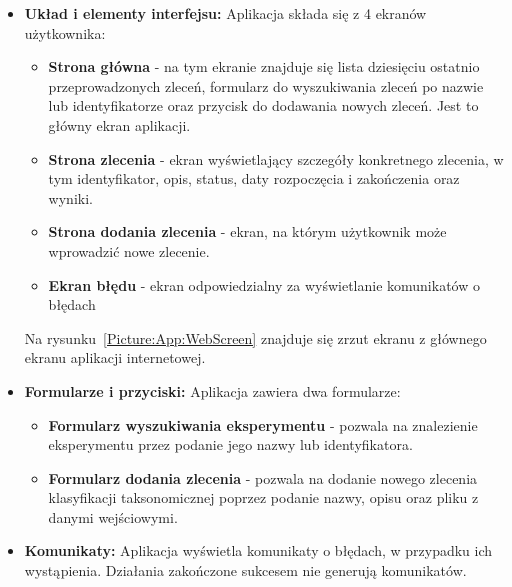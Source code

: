                 \begin{itemize}
                    \item {
                        \textbf{Układ i elementy interfejsu:}
                        Aplikacja składa się z 4 ekranów użytkownika:
                        \begin{itemize}
                            \item {
                                \textbf{Strona główna} - na tym ekranie znajduje się lista dziesięciu ostatnio przeprowadzonych zleceń, formularz do wyszukiwania zleceń po nazwie lub identyfikatorze oraz przycisk do dodawania nowych zleceń. Jest to główny ekran aplikacji.
                                }
                            \item {
                                \textbf{Strona zlecenia} - ekran wyświetlający szczegóły konkretnego zlecenia, w tym identyfikator, opis, status, daty rozpoczęcia i zakończenia oraz wyniki.
                            }
                            \item {
                                \textbf{Strona dodania zlecenia} - ekran, na którym użytkownik może wprowadzić nowe zlecenie. 
                            }
                            \item {
                                \textbf{Ekran błędu} - ekran odpowiedzialny za wyświetlanie komunikatów o błędach
                            }
                        \end{itemize}
                        Na rysunku~\ref{Picture:App:WebScreen} znajduje się zrzut ekranu z głównego ekranu aplikacji internetowej.
                    }
                    \item {
                        \textbf{Formularze i przyciski:}
                        Aplikacja zawiera dwa formularze:
                        \begin{itemize}
                            \item {
                                \textbf{Formularz wyszukiwania eksperymentu} - pozwala na znalezienie eksperymentu przez podanie jego nazwy lub identyfikatora.
                            }
                            \item {
                                \textbf{Formularz dodania zlecenia} - pozwala na dodanie nowego zlecenia klasyfikacji taksonomicznej poprzez podanie nazwy, opisu oraz pliku z danymi wejściowymi.
                            }
                        \end{itemize}
                    }
                    \item {
                        \textbf{Komunikaty:}
                        Aplikacja wyświetla komunikaty o błędach, w przypadku ich wystąpienia. Działania zakończone sukcesem nie generują komunikatów.
                    }
                \end{itemize}

